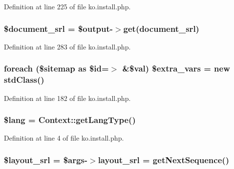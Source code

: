 Definition at line 225 of file ko.\+install.\+php.

\hypertarget{ko_8install_8php_a14522e7fff0604a8372c75b4a0fbc0fd}{}
\subsubsection[{\$document\+\_\+srl}]{\setlength{\rightskip}{0pt plus 5cm}\$document\+\_\+srl = \$output-\/$>$get(\textquotesingle{}document\+\_\+srl\textquotesingle{})}\label{ko_8install_8php_a14522e7fff0604a8372c75b4a0fbc0fd}


Definition at line 283 of file ko.\+install.\+php.

\hypertarget{ko_8install_8php_a99863a9d4b597491e1a9c801f2e55c0b}{}
\subsubsection[{\$extra\+\_\+vars}]{\setlength{\rightskip}{0pt plus 5cm}foreach (\$sitemap as \$id=$>$ \&\$val) \${\bf extra\+\_\+vars} = new std\+Class()}\label{ko_8install_8php_a99863a9d4b597491e1a9c801f2e55c0b}


Definition at line 182 of file ko.\+install.\+php.

\hypertarget{ko_8install_8php_a7714b111b644017933931ec69a154102}{}
\subsubsection[{\$lang}]{\setlength{\rightskip}{0pt plus 5cm}\$lang = {\bf Context\+::get\+Lang\+Type}()}\label{ko_8install_8php_a7714b111b644017933931ec69a154102}


Definition at line 4 of file ko.\+install.\+php.

\hypertarget{ko_8install_8php_a77889723c4aa360089caae223118d413}{}
\subsubsection[{\$layout\+\_\+srl}]{\setlength{\rightskip}{0pt plus 5cm}\${\bf layout\+\_\+srl} = \$args-\/$>${\bf layout\+\_\+srl} = {\bf get\+Next\+Sequence}()}\label{ko_8install_8php_a77889723c4aa360089caae223118d413}


